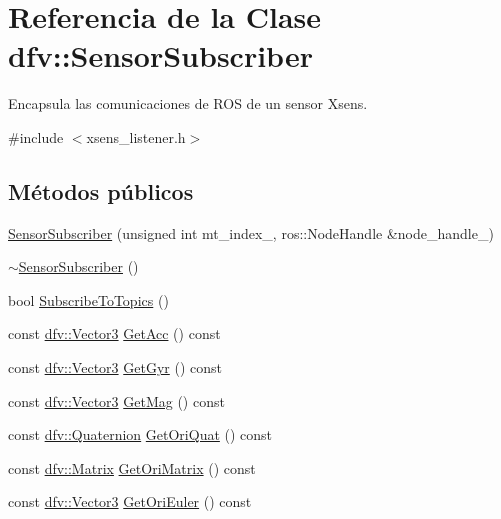 \hypertarget{classdfv_1_1SensorSubscriber}{\section{\-Referencia de la \-Clase dfv\-:\-:\-Sensor\-Subscriber}
\label{classdfv_1_1SensorSubscriber}
}


\-Encapsula las comunicaciones de \-R\-O\-S de un sensor \-Xsens.  




{\ttfamily \#include $<$xsens\-\_\-listener.\-h$>$}

\subsection*{\-Métodos públicos}
\begin{DoxyCompactItemize}
\item 
\hyperlink{classdfv_1_1SensorSubscriber_a7596701a0faf0144e9c52cb09a92de86}{\-Sensor\-Subscriber} (unsigned int mt\-\_\-index\-\_\-, ros\-::\-Node\-Handle \&node\-\_\-handle\-\_\-)
\item 
\hyperlink{classdfv_1_1SensorSubscriber_aad63894472798f2e15e3f54bb8c7c78c}{$\sim$\-Sensor\-Subscriber} ()
\item 
bool \hyperlink{classdfv_1_1SensorSubscriber_ab33fdef7d3fff1bf80550a7c2f3b6889}{\-Subscribe\-To\-Topics} ()
\item 
const \hyperlink{classdfv_1_1Vector3}{dfv\-::\-Vector3} \hyperlink{classdfv_1_1SensorSubscriber_a8d90eadc91d8c97154b3d89341d5db40}{\-Get\-Acc} () const 
\item 
const \hyperlink{classdfv_1_1Vector3}{dfv\-::\-Vector3} \hyperlink{classdfv_1_1SensorSubscriber_a11fe5e8b67856541ec6a24291923dc62}{\-Get\-Gyr} () const 
\item 
const \hyperlink{classdfv_1_1Vector3}{dfv\-::\-Vector3} \hyperlink{classdfv_1_1SensorSubscriber_af6eb616df620fb7d3b9036166bb2fdf6}{\-Get\-Mag} () const 
\item 
const \hyperlink{classdfv_1_1Quaternion}{dfv\-::\-Quaternion} \hyperlink{classdfv_1_1SensorSubscriber_a0e1dad84a58e4ae8708f288c8ae0082d}{\-Get\-Ori\-Quat} () const 
\item 
const \hyperlink{classdfv_1_1Matrix}{dfv\-::\-Matrix} \hyperlink{classdfv_1_1SensorSubscriber_a87b5976432890a79361a1cfc8d39f32d}{\-Get\-Ori\-Matrix} () const 
\item 
const \hyperlink{classdfv_1_1Vector3}{dfv\-::\-Vector3} \hyperlink{classdfv_1_1SensorSubscriber_ac9ab6d72a5dfaffb4e810d2246fd8eff}{\-Get\-Ori\-Euler} () const 
\end{DoxyCompactItemize}



